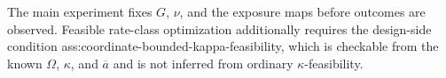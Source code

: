 The main experiment fixes \(G\), \(\nu\), and the exposure maps before outcomes are observed.  Feasible rate-class optimization additionally requires the design-side condition ass:coordinate-bounded-kappa-feasibility, which is checkable from the known \(\Omega\), \(\kappa\), and \(\overline a\) and is not inferred from ordinary \(\kappa\)-feasibility.